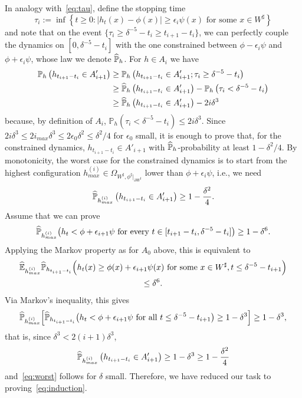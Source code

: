 \documentclass[10pt]{amsart}
\theoremstyle{definition}\newtheorem{defi}[theo]{Definition}\newtheorem{rema}[theo]{Remark}\newtheorem{exam}[theo]{Example}\newtheorem{exem}[theo]{Example}\newtheorem{nota}[theo]{Notation}
\newcommand{\E}{\mathbb{E}}
\renewcommand{\P}{\mathbb{P}}
\newcommand{\eps}{\epsilon}
\renewcommand{\d}{{\sharp }}
\let\oldhat\hat
\renewcommand*{\hat}[1]{\mathchoice{\widehat{#1}}{\widehat{#1}}{\oldhat{#1}}{\oldhat{#1}}}
\begin{document}
In analogy with~\eqref{eq:tau}, define the stopping time
\begin{equation}\label{eq:taui}
\tau_i:=\inf\left\{t\ge0:|h_t(x)-\phi(x)|\geq \epsilon_{i}\psi(x) \text{ for some } x\in W^\d\right\}
\end{equation}
and note that on the event $\{\tau_i\ge \delta^{-5}-t_i\ge t_{i+1}-t_i\}$, we can perfectly couple the dynamics on $[0,\delta^{-5}-t_i] $ with the one constrained between $\phi-\epsilon_i\psi$ and $\phi+\epsilon_i\psi$, whose law we denote $\hat\P_h$. For $h\in A_i$ we have
\begin{equation}
\begin{split}
\P_h\left(h_{t_{i+1}-t_i}\in A'_{i+1}\right) &\ge \P_h\left(h_{t_{i+1}-t_i}\in A'_{i+1};\tau_i \ge\delta^{-5}-t_i\right)\\
&\ge\hat \P_h\left(h_{t_{i+1}-t_i}\in A'_{i+1}\right) - \P_h\left(\tau_i < \delta^{-5}-t_i\right)\\
&\ge \hat \P_h\left(h_{t_{i+1}-t_i}\in A'_{i+1}\right)-2i\delta^3
\end{split}
\end{equation}
because, by definition of $A_i$, $\P_h(\tau_i<\delta^{-5}-t_i)\le 2i\delta^3$. Since $2i\delta^3\le 2i_{max}\delta^3\le 2\epsilon_0\delta^2\le \delta^2/4$ for $\epsilon_0$ small, it is enough to prove that, for the constrained dynamics, $h_{t_{i+1} - t_i} \in A'_{i+1}$ with $\hat\P_h$-probability at least $1-\delta^2/4$. By monotonicity, the worst case for the constrained dynamics is to start from the highest configuration $h^{(i)}_{max}\in \Omega_{W^\d,\phi^\d|_{\partial W^\d}}$ lower than $\phi + \eps_i \psi$, i.e., we need
\begin{equation}\label{eq:worst}
\hat \P_{h^{(i)}_{max}}\left(h_{t_{i+1}-t_i}\in A'_{i+1}\right)\ge 1-\frac{\delta^2}4.
\end{equation}
Assume that we can prove
\begin{equation}\label{eq:induction}
\hat\P_{h^{(i)}_{max}} \big(h_t < \phi + \eps_{i+1} \psi \text{ for every } t\in [t_{i+1} - t_i, \delta^{-5}- t_i]\big)\\
\geq 1 - \delta^6.
\end{equation}
Applying the Markov property as for $A_0$ above, this is equivalent to
\begin{multline}
\hat \E_{h^{(i)}_{max}}\hat \P_{h_{t_{i+1}-t_i}}\Big(h_t(x)\ge \phi(x)+\epsilon_{i+1}\psi(x) \text{ for some } x\in W^\d, t\le \delta^{-5}-{t_{i+1}}\Big)\\
\leq \delta^6.
\end{multline}
Via Markov's inequality, this gives
\begin{equation}
\hat \P_{h^{(i)}_{max}}\Big[\hat\P_{h_{t_{i+1}-t_i}}\big(h_t<\phi+\epsilon_{i+1}\psi \text{ for all } t\le \delta^{-5}-{t_{i+1}}\big)\ge 1-\delta^3\Big]\ge 1-\delta^3,
\end{equation}
that is, since $\delta^3< 2(i+1)\delta^3$,
\begin{equation}
\hat \P_{h^{(i)}_{max}}\left(h_{t_{i+1}-t_i}\in A'_{i+1}\right)\ge 1-\delta^3\ge1-\frac{\delta^2}4
\end{equation}
and~\eqref{eq:worst} follows for $\delta$ small. Therefore, we have reduced our task to proving~\eqref{eq:induction}.
\end{document}
